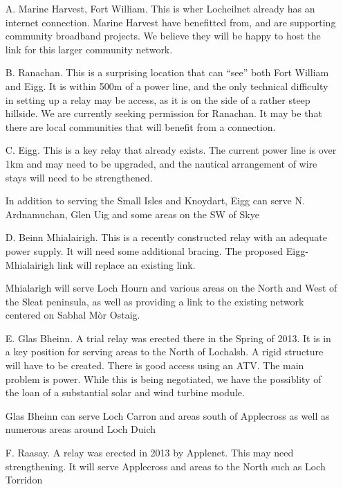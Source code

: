 \begin{itemize}
\item[A.] Marine Harvest, Fort William.  This is wher Locheilnet
  already has an internet connection.  Marine Harvest have benefitted
  from, and are supporting community broadband projects.  We believe
  they will be happy to host the link for this larger community
  network.

\item[B.] Ranachan.  This is a surprising location that can ``see''
  both Fort William and Eigg.  It is within 500m of a power line, and
  the only technical difficulty in setting up a relay may be
  access, as it is on the side of a rather steep hillside. We are
  currently seeking permission for Ranachan.  It may be that there are
  local communities that will benefit from a connection.

\item[C.] Eigg.  This is a key relay that already exists.  The current
  power line is over 1km and may need to be upgraded, and the nautical
  arrangement of wire stays will need to be strengthened.

  In addition to serving the Small Isles and Knoydart, Eigg can serve
  N. Ardnamuchan, Glen Uig and some areas on the SW of Skye

\item[D.] Beinn Mhialairigh.  This is a recently constructed relay
  with an adequate power supply.  It will need some additional
  bracing.  The proposed Eigg-Mhialairigh link will replace an
  existing link.

  Mhialarigh will serve Loch Hourn and various areas on the North and
  West of the Sleat peninsula, as well
  as providing a link to the existing network centered on Sabhal M\`or Ostaig.

\item[E.] Glas Bheinn.  A trial relay was erected there in the Spring
  of 2013.  It is in a key position for serving areas to the
  North of Lochalsh.  A rigid structure will have to be created.
  There is good access using an ATV.  The main problem is power.
  While this is being negotiated, we have the possiblity of the loan
  of a substantial solar and wind turbine module.

  Glas Bheinn can serve Loch Carron and areas south of Applecross as
  well as numerous areas around Loch Duich

\item[F.] Raasay.  A relay was erected in 2013 by Applenet.  This may
  need strengthening.  It will serve Applecross and areas to the North
  such as Loch Torridon

\end{itemize}

